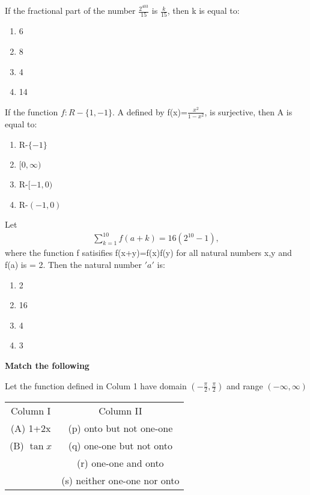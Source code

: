 \item If the fractional part of the number $\frac{2^{403}}{15}$ is $\frac{k}{15}$, then k is equal to:
\begin{enumerate}
\item 6
\item 8
\item 4
\item 14
\end{enumerate}

\item If the function $f:R-\{1,-1\}$. A defined by f(x)=$\frac{x^2}{1-x^2}$, is surjective, then A is equal to:
\begin{enumerate}
\item R-$\{-1\}$
\item $[0,\infty)$
\item R-$[-1,0)$
\item R-$(-1,0)$
\end{enumerate}

\item Let
\begin{align*}
\sum_{k=1}^{10} f(a+k)=16(2^{10}-1),
\end{align*} 
where the function f satisifies f(x+y)=f(x)f(y) for all natural numbers x,y and f(a) is = 2. Then the natural number $'a'$ is:
\begin{enumerate}
\item 2
\item 16
\item 4
\item 3
\end{enumerate}

\textbf{Match the following}

\item Let the function defined in Colum 1 have domain $(-\frac{\pi}{2},\frac{\pi}{2})$ and range $(-\infty,\infty)$
\begin{table}[h!]
\centering
\begin{tabular}{c c} 
 Column I & Column II\\ [0.5ex] 
 (A) 1+2x & (p) onto but not one-one\\ 
 (B) $\tan x$ & (q) one-one but not onto\\
     & (r) one-one and onto\\
     & (s) neither one-one nor onto\\[1ex] 
\end{tabular}
\end{table}

